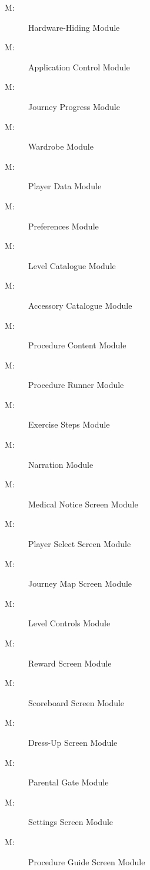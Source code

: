 \documentclass[12pt, titlepage]{article}
\newcounter{mnum}
\newcommand{\mthemnum}{M\themnum}
\begin{document}
\begin{description}
\item [ \mthemnum \label{mHH}:] Hardware-Hiding Module
\item [ \mthemnum \label{mControl}:] Application Control Module
\item [ \mthemnum \label{mProgress}:] Journey Progress Module
\item [ \mthemnum \label{mWardrobe}:] Wardrobe Module
\item [ \mthemnum \label{mPlayerData}:] Player Data Module
\item [ \mthemnum \label{mPrefs}:] Preferences Module
\item [ \mthemnum \label{mLevels}:] Level Catalogue Module
\item [ \mthemnum \label{mAccessories}:] Accessory Catalogue Module
\item [ \mthemnum \label{mContent}:] Procedure Content Module
\item [ \mthemnum \label{mRunner}:] Procedure Runner Module
\item [ \mthemnum \label{mSteps}:] Exercise Steps Module
\item [ \mthemnum \label{mNarration}:] Narration Module
\item [ \mthemnum \label{mNotice}:] Medical Notice Screen Module
\item [ \mthemnum \label{mPlayerSelect}:] Player Select Screen Module
\item [ \mthemnum \label{mMap}:] Journey Map Screen Module
\item [ \mthemnum \label{mHud}:] Level Controls Module
\item [ \mthemnum \label{mReward}:] Reward Screen Module
\item [ \mthemnum \label{mScoreboard}:] Scoreboard Screen Module
\item [ \mthemnum \label{mDressUp}:] Dress-Up Screen Module
\item [ \mthemnum \label{mGate}:] Parental Gate Module
\item [ \mthemnum \label{mSettings}:] Settings Screen Module
\item [ \mthemnum \label{mGuide}:] Procedure Guide Screen Module

\end{description}
\end{document}
